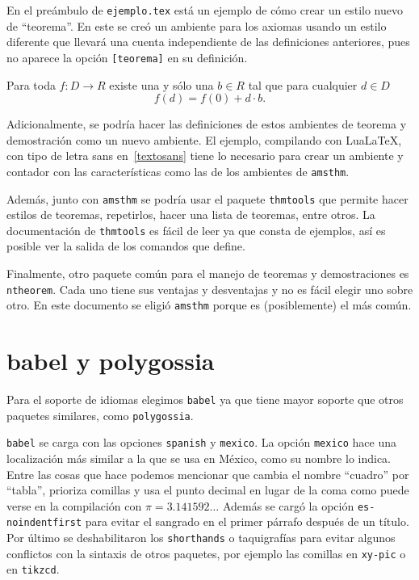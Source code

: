 En el preámbulo de \texttt{ejemplo.tex} está un ejemplo de cómo crear un
estilo nuevo de \enquote{teorema}. En este se creó un ambiente para los axiomas
usando un estilo diferente que llevará una cuenta independiente de las
definiciones anteriores, pues no aparece la opción \texttt{[teorema]} en su
definición.

\begin{axioma}
  Para toda \(f\colon D\to R\) existe una y sólo una \(b\in R\) tal que para
  cualquier \(d\in D\)
  \[
    f(d)=f(0)+d\cdot b.
  \]
\end{axioma}

Adicionalmente, se podría hacer las definiciones de estos ambientes de
teorema y demostración como un nuevo ambiente. El ejemplo, compilando con
Lua\LaTeX, con tipo de letra sans en~\ref{textosans} tiene lo necesario para
crear un ambiente y contador con las características como las de los
ambientes de \texttt{amsthm}.

Además, junto con \texttt{amsthm} se podría usar el paquete
\texttt{thmtools} que permite hacer estilos de teoremas, repetirlos, hacer
una lista de teoremas, entre otros. La documentación de \texttt{thmtools} es
fácil de leer ya que consta de ejemplos, así es posible ver la salida de los
comandos que define.

Finalmente, otro paquete común para el manejo de teoremas y demostraciones
es \texttt{ntheorem}. Cada uno tiene sus ventajas y desventajas y no es
fácil elegir uno sobre otro. En este documento se eligió \texttt{amsthm}
porque es (posiblemente) el más común.


\section{babel y polygossia}%
\label{sec:babel}
Para el soporte de idiomas elegimos \texttt{babel} ya que tiene mayor soporte que otros paquetes similares, como \texttt{polygossia}.

\texttt{babel} se carga con las opciones \texttt{spanish} y
\texttt{mexico}. La opción \texttt{mexico} hace una localización más similar
a la que se usa en México, como su nombre lo indica. Entre las cosas que
hace podemos mencionar que cambia el nombre \enquote{cuadro} por \enquote{tabla},
prioriza comillas y usa el punto decimal en lugar de la coma como puede
verse en la compilación con \(\pi=3.141592\ldots \) Además se
cargó la opción \texttt{es-noindentfirst} para evitar el sangrado en el
primer párrafo después de un título. Por
último se deshabilitaron los \texttt{shorthands} o taquigrafías para evitar
algunos conflictos con la sintaxis de otros paquetes, por ejemplo las
comillas en \texttt{xy-pic} o en \texttt{tikzcd}.

